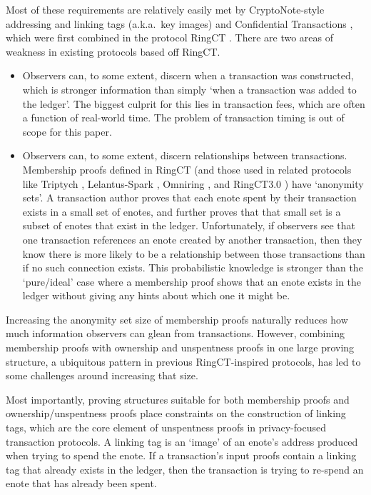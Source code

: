 Most of these requirements are relatively easily met by CryptoNote-style addressing and linking tags (a.k.a.\ key images) \cite{cryptoNoteWhitePaper} and Confidential Transactions \cite{maxwell-ct-2}, which were first combined in the protocol RingCT \cite{MRL-0005-ringct}. There are two areas of weakness in existing protocols based off RingCT.

\begin{itemize}
    \item Observers can, to some extent, discern when a transaction was constructed, which is stronger information than simply `when a transaction was added to the ledger'. The biggest culprit for this lies in transaction fees, which are often a function of real-world time. The problem of transaction timing is out of scope for this paper.
    \item Observers can, to some extent, discern relationships between transactions. Membership proofs defined in RingCT (and those used in related protocols like Triptych \cite{triptych-preprint}, Lelantus-Spark \cite{lelantus-spark}, Omniring \cite{omniring-paper}, and RingCT3.0 \cite{ringct3-preprint}) have `anonymity sets'. A transaction author proves that each enote spent by their transaction exists in a small set of enotes, and further proves that that small set is a subset of enotes that exist in the ledger. Unfortunately, if observers see that one transaction references an enote created by another transaction, then they know there is more likely to be a relationship between those transactions than if no such connection exists. This probabilistic knowledge is stronger than the `pure/ideal' case where a membership proof shows that an enote exists in the ledger without giving any hints about which one it might be.
\end{itemize}

Increasing the anonymity set size of membership proofs naturally reduces how much information observers can glean from transactions. However, combining membership proofs with ownership and unspentness proofs in one large proving structure, a ubiquitous pattern in previous RingCT-inspired protocols, has led to some challenges around increasing that size.

Most importantly, proving structures suitable for both membership proofs and ownership/unspentness proofs place constraints on the construction of linking tags, which are the core element of unspentness proofs in privacy-focused transaction protocols. A linking tag is an `image' of an enote's address produced when trying to spend the enote. If a transaction's input proofs contain a linking tag that already exists in the ledger, then the transaction is trying to re-spend an enote that has already been spent.

